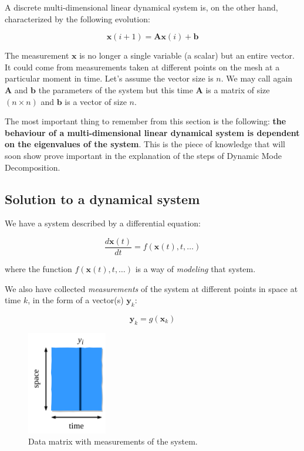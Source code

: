 \documentclass[10pt,twocolumn]{article}
\begin{document}
A discrete multi-dimensional linear dynamical system is, on the other hand, characterized by the following evolution:

\begin{equation}
\mathbf{x}(i+1) = \mathbf{A} \mathbf{x}(i) + \mathbf{b}
\end{equation}

The measurement $\mathbf{x}$ is no longer a single variable (a scalar) but an entire vector. It could come from measurements taken at different points on the mesh at a particular moment in time. Let's assume the vector size is $n$. We may call again $\mathbf{A}$ and $\mathbf{b}$ the parameters of the system but this time $\mathbf{A}$ is a matrix of size $(n \times n)$ and $\mathbf{b}$ is a vector of size $n$.

The most important thing to remember from this section is the following: \textbf{the behaviour of a multi-dimensional linear dynamical system is dependent on the eigenvalues of the system}. This is the piece of knowledge that will soon show prove important in the explanation of the steps of Dynamic Mode Decomposition.

\subsection{Solution to a dynamical system}

We have a system described by a differential equation:

\begin{equation} \label{eq:system_DE}
\frac{d \mathbf{x}(t)}{dt} = f(\mathbf{x}(t), t, \dots)
\end{equation}

where the function $f(\mathbf{x}(t), t, \dots)$ is a way of \textit{modeling} that system.

We also have collected \textit{measurements} of the system at different points in space at time $k$, in the form of a vector(s) $\mathbf{\mathbf{y}}_k$:

\begin{equation}
\mathbf{\mathbf{y}}_k = g(\mathbf{x}_k)
\end{equation}

\begin{figure}
\centering\includegraphics[width=3.5cm]{data-matrix.png}
\caption{Data matrix with measurements of the system.}
\label{fig:data-matrix}
\end{figure}
\end{document}
